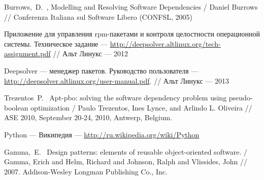 Burrows,~D.~,
Modelling and Resolving Software Dependencies /
Daniel Burrows //
Conferenza Italiana sul Software Libero (CONFSL, 2005)

Приложение для управления rpm-пакетами и контроля целостности операционной системы. Техническое задание 
--- \url{http://deepsolver.altlinux.org/tech-assignment.pdf} // Альт Линукс --- 2012

Deepsolver --- менеджер пакетов. Руководство пользователя
--- \url{http://deepsolver.altlinux.org/user-manual.pdf}. // Альт Линукс --- 2013

Trezentos~P.~
Apt-pbo: solving the software dependency problem using pseudo-boolean optimization /
Paulo Trezentos, Ines Lynce, and Arlindo L. Oliveira //
ASE 2010, September 20-24, 2010, Antwerp, Belgium.

Python --- Википедия
--- \url{http://ru.wikipedia.org/wiki/Python}

Gamma,~E.~
Design patterns: elements of reusable object-oriented software. /
Gamma, Erich and Helm, Richard and Johnson, Ralph and Vlissides, John //
2007. Addison-Wesley Longman Publishing Co., Inc.
